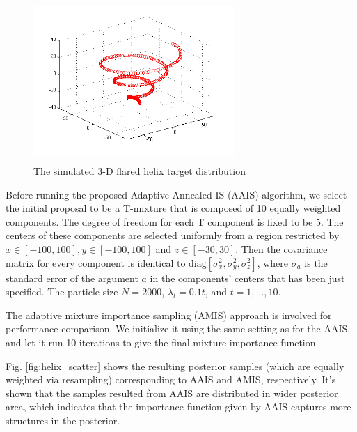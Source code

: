 \begin{figure}[!htb]
\centerline{\includegraphics[width=3in,height=2.4in]{Fig/flared_helix_target}}
\caption{The simulated 3-D flared helix target distribution}
\label{fig:flared_helix_target}
\end{figure}
Before running the proposed Adaptive Annealed IS (AAIS) algorithm,
we select the initial proposal to be a T-mixture that is composed of
10 equally weighted components. The degree of freedom for each T
component is fixed to be 5. The centers of these components are
selected uniformly from a region restricted by
$x\in[-100,100],y\in[-100,100]$ and $z\in[-30,30]$. Then the
covariance matrix for every component is identical to
$\mbox{diag}[\sigma_x^2,\sigma_y^2,\sigma_z^2]$, where $\sigma_a$ is
the standard error of the argument $a$ in the components' centers
that has been just specified. The particle size $N=2000$,
$\lambda_t=0.1t$, and $t=1,\ldots,10$.

The adaptive mixture importance sampling (AMIS) approach
\cite{cappe2008ais} is involved for performance comparison. We
initialize it using the same setting as for the AAIS, and let it run
10 iterations to give the final mixture importance function.

Fig. \ref{fig:helix_scatter} shows the resulting posterior samples
(which are equally weighted via resampling) corresponding to AAIS
and AMIS, respectively. It's shown that the samples resulted from
AAIS are distributed in wider posterior area, which indicates that
the importance function given by AAIS captures more structures in
the posterior.

